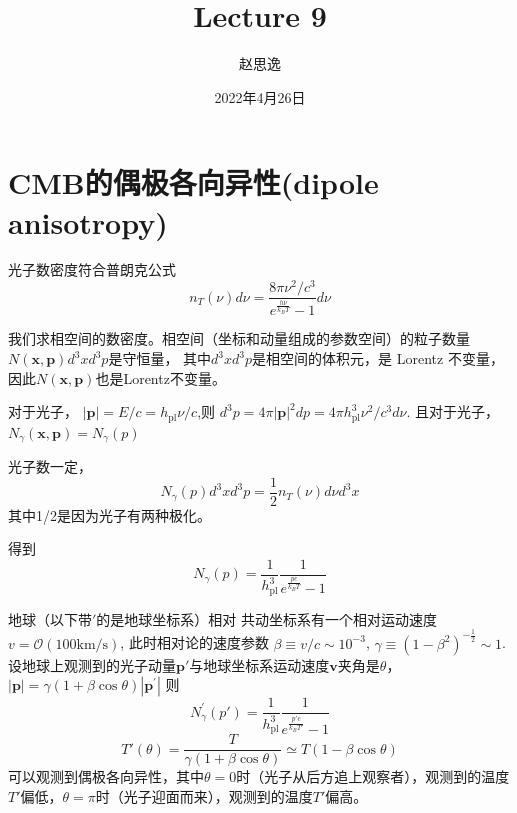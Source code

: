\documentclass[12pt]{ctexart}
\title{Lecture 9}
\author{赵思逸}
\date{2022年4月26日}
\begin{document}
\maketitle

\section{CMB的偶极各向异性(dipole anisotropy)}

光子数密度符合普朗克公式
\begin{equation}
    n_T\left(\nu\right) d\nu = \frac{8\pi \nu^2 /c^3}{e^\frac{h\nu}{k_BT}-1} d\nu
\end{equation}

我们求相空间的数密度。相空间（坐标和动量组成的参数空间）的粒子数量 $N\left(\boldsymbol{x},\boldsymbol{p}\right) d^3x d^3p$是守恒量， 其中$d^3x d^3p$是相空间的体积元，是 Lorentz 不变量， 因此$N\left(\boldsymbol{x},\boldsymbol{p}\right)$也是Lorentz不变量。

对于光子， $|\boldsymbol{p}|=E/c=h_{\mathrm{pl}} \nu/c$,则 $d^3p=4\pi |\boldsymbol{p}|^2 dp=4\pi h_{\mathrm{pl}}^3 \nu^2/c^3 d\nu$. 且对于光子， $N_\gamma(\boldsymbol{x},\boldsymbol{p})=N_\gamma\left(p\right) $

光子数一定，
\begin{equation}
    N_\gamma(p)d^3x d^3p = \frac{1}{2} n_T\left(\nu\right) d\nu d^3x
\end{equation}
其中1/2是因为光子有两种极化。

得到 
\begin{equation}
    N_\gamma(p) = \frac{1}{h_{\mathrm{pl}}^3} \frac{1}{e^\frac{pc}{k_B T}-1}
\end{equation}

地球（以下带$'$的是地球坐标系）相对 共动坐标系有一个相对运动速度
$v = \mathcal{O} \left(100 \mathrm{km/s}\right) $, 
此时相对论的速度参数
$\beta \equiv v/c\sim 10^{-3}$,
$\gamma \equiv \left(1-\beta^2\right)^{-\frac{1}{2}}\sim 1$. 
设地球上观测到的光子动量$\boldsymbol{p'}$与地球坐标系运动速度$\boldsymbol{v}$夹角是$\theta$，$|\boldsymbol{p}| =\gamma \left(1+\beta \cos \theta \right) |\boldsymbol{p^\prime}|$
则
\begin{equation}
    N_\gamma^\prime(p') = \frac{1}{h_{\mathrm{pl}}^3} \frac{1}{e^\frac{p'c}{k_B T'}-1}
\end{equation}
\begin{equation}
    T'\left(\theta\right) = \frac{T}{\gamma \left(1+\beta \cos \theta\right) } \simeq T\left(1-\beta \cos \theta\right) 
\end{equation}
可以观测到偶极各向异性，其中$\theta=0$时（光子从后方追上观察者），观测到的温度$T'$偏低，$\theta=\pi$时（光子迎面而来），观测到的温度$T'$偏高。
\end{document}
